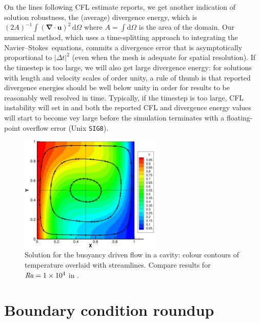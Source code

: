 \documentclass[11pt]{report}
\def\Ra{\mbox{\it Ra}}                              %
\newcommand\cd{\mathrm{d}} \newcommand\cD{\mathrm{D}}
\newcommand\NavSto{Navier--Stokes}
\begin{document}
On the lines following CFL estimate reports, we get another indication
of solution robustness, the (average) divergence energy, which is
$(2A)^{-1}\int (\bm{\nabla\cdot u})^2\, \cd \Omega$ where $A=\int\cd\Omega$
is the area of the domain.  Our numerical method, which uses a
time-splitting approach to integrating the \NavSto\ equations, commits
a divergence error that is asymptotically proportional to $|\Delta
t|^2$ (even when the mesh is adequate for spatial resolution). If the
timestep is too large, we will also get large divergence energy: for
solutions with length and velocity scales of order unity, a rule of
thumb is that reported divergence energies should be well below unity
in order for results to be reasonably well resolved in time.
Typically, if the timestep is too large, CFL instability will set in
and both the reported CFL and divergence energy values will start to
become vey large before the simulation terminates with a
floating-point overflow error (Unix \verb|SIG8|).

\begin{figure}
\begin{center}
\includegraphics[width=0.6\textwidth]{tdrivcav}
\end{center}
\caption{
\label{fig.tdrivcav}
Solution for the buoyancy driven flow in a cavity: colour contours of
temperature overlaid with streamlines. Compare results for
$\Ra=1\times10^4$ in \citet{dvd83}. }
\end{figure}

\section{Boundary condition roundup}
\label{sec.bcs}
\end{document}
